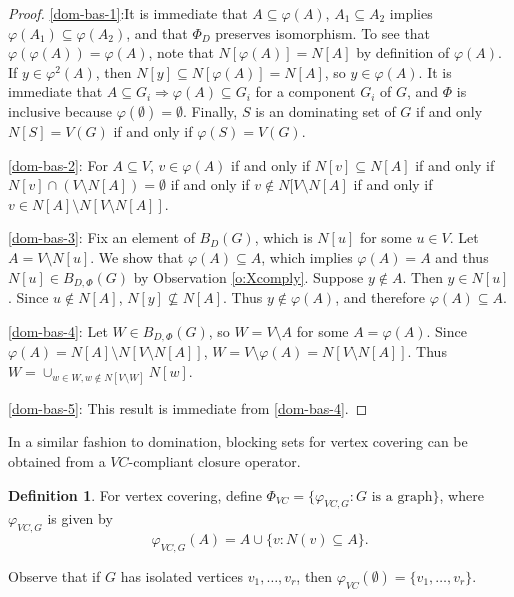 \documentclass{article}
\numberwithin{figure}{section}
\numberwithin{table}{section}
\numberwithin{equation}{section}
\theoremstyle{definition}
\theoremstyle{definition}
\newtheorem{defn}[thm]{Definition}
\theoremstyle{definition}
\newcommand{\bpf}{\begin{proof}}
\newcommand{\epf}{\end{proof}\ms}
\newcommand{\ms}{\medskip}
\begin{document}
{\bpf  
\eqref{dom-bas-1}:It is immediate that  $A\subseteq \varphi(A)$, $A_1\subseteq A_2$ implies $\varphi(A_1)\subseteq \varphi(A_2)$, and that  $ \Phi_{D}$ preserves isomorphism.   To see that $\varphi(\varphi(A))=\varphi(A)$, note that  $N[\varphi(A)]=N[A]$ by  definition of $\varphi(A)$.  If $y\in \varphi^2(A)$, then $N[y]\subseteq N[\varphi(A)]=N[A]$, so  $y \in \varphi(A)$.   It is immediate that $A\subseteq G_i\Rightarrow \varphi(A)\subseteq G_i$ for a component $G_i$ of $G$, and   $\Phi$ is inclusive because $\varphi(\emptyset)=\emptyset$. Finally,   $S$ is an dominating set of $G$ if and only $N[S]=V(G)$ if and only if $\varphi(S) = V(G)$.

\eqref{dom-bas-2}: For $A\subseteq V$, $v\in \varphi(A)$ if and only if $N[v]\subseteq N[A]$ if and only if $N[v]\cap (V\setminus N[A])=\emptyset$ if and only if $v\not\in N[V\setminus N[A]$ if and only if  $v\in N[A]\setminus N[V\setminus N[A]]$. 

\eqref{dom-bas-3}: Fix an element of $B_D(G)$, which is $N[u]$ for some $u\in V$. Let $A=V\setminus N[u]$. We show that $\varphi(A)\subseteq A$, which implies $\varphi(A)= A$  and thus  $ N[u]\in  B_{D,\Phi}(G)$ by Observation \ref{o:Xcomply}.   
Suppose $y\not\in A$.  Then $y\in N[u]$. Since $u\not\in N[A]$, $N[y]\not\subseteq N[A]$.  Thus $y\not\in \varphi(A)$, and therefore $\varphi(A)\subseteq A$.



\eqref{dom-bas-4}:  Let $W\in B_{D,\Phi}(G)$, so $W=V\setminus A$ for some $A=\varphi(A)$.
 Since $\varphi(A)= N[A]  \setminus N[V\setminus N[A]]$, $W=V\setminus \varphi(A) =N[V\setminus N[A]]$.  
 Thus 
$W=\cup_{w\in W, w\not\in N[V\setminus W]}N[w].$ 

\eqref{dom-bas-5}: This result is immediate from \ref{dom-bas-4}.
\epf


 In a similar fashion to domination, blocking sets for vertex covering can be obtained from a $VC$-compliant closure operator.

\begin{defn}
For vertex covering, define $\Phi_{VC} = \{\varphi_{VC,G} : G \text{ is a graph}\}$, where $\varphi_{VC,G}$ is given by 
\[
\varphi_{VC,G}(A)= A \cup\{v:N(v)\subseteq A\}.
\]
\end{defn}
 Observe that if $G$ has isolated vertices $v_1,\dots,v_r$, then $\varphi_{VC}(\emptyset)=\{v_1,\dots,v_r\}$.
 
}
\end{document}
